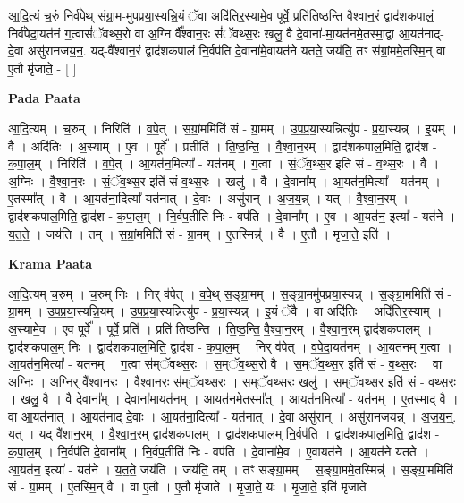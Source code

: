 \documentclass[17pt]{extarticle}
\begin{document}
आ॒दि॒त्यं च॒रुं निर्व॑पेथ् संग्रा॒म-मु॑पप्रया॒स्यन्नि॒यं ॅवा अदि॑तिर॒स्यामे॒व पूर्वे॒ प्रति॑तिष्ठन्ति वैश्वान॒रं द्वाद॑शकपालं॒ निर्व॑पेदा॒यत॑नं ग॒त्वासं॑ॅवथ्स॒रो वा अ॒ग्नि र्वै᳚श्वान॒रः सं॑ॅवथ्स॒रः खलु॒ वै दे॒वाना॑-मा॒यत॑नमे॒तस्मा॒द्वा आ॒यत॑नाद्-दे॒वा असु॑रानजय॒न॒. यद्-वै᳚श्वान॒रं द्वाद॑शकपालं नि॒र्वप॑ति दे॒वाना॑मे॒वायत॑ने यतते॒ जय॑ति॒ तꣳ स॑ग्रां॒ममे॒तस्मि॒न् वा ए॒तौ मृ॑जाते॒ - [  ] \newline

\textbf{Pada Paata} \newline

आ॒दि॒त्यम् । च॒रुम् । निरिति॑ । व॒पे॒त् । स॒ग्रां॒ममिति॑ सं - ग्रा॒मम् । उ॒प॒प्र॒या॒स्यन्नित्यु॑प - प्र॒या॒स्यन्न् । इ॒यम् । वै । अदि॑तिः । अ॒स्याम् । ए॒व । पूर्वे᳚ । प्रतीति॑ । ति॒ष्ठ॒न्ति॒ । वै॒श्वा॒न॒रम् । द्वाद॑शकपाल॒मिति॒ द्वाद॑श - क॒पा॒ल॒म् । निरिति॑ । व॒पे॒त् । आ॒यत॑न॒मित्या᳚ - यत॑नम् । ग॒त्वा । सं॒ॅव॒थ्स॒र इति॑ सं - व॒थ्स॒रः । वै । अ॒ग्निः । वै॒श्वा॒न॒रः । सं॒ॅव॒थ्स॒र इति॑ सं-व॒थ्स॒रः । खलु॑ । वै । दे॒वाना᳚म् । आ॒यत॑न॒मित्या᳚ - यत॑नम् । ए॒तस्मा᳚त् । वै । आ॒यत॑ना॒दित्या᳚-यत॑नात् । दे॒वाः । असु॑रान् । अ॒ज॒य॒न्न् । यत् । वै॒श्वा॒न॒रम् । द्वाद॑शकपाल॒मिति॒ द्वाद॑श - क॒पा॒ल॒म् । नि॒र्वप॒तीति॑ निः - वप॑ति । दे॒वाना᳚म् । ए॒व । आ॒यत॑न॒ इत्या᳚ - यत॑ने । य॒त॒ते॒ । जय॑ति । तम् । स॒ग्रां॒ममिति॑ सं - ग्रा॒मम् । ए॒तस्मिन्न्॑ । वै । ए॒तौ । मृ॒जा॒ते॒ इति॑ ।  \newline


\textbf{Krama Paata} \newline

आ॒दि॒त्यम् च॒रुम् । च॒रुम् निः । निर् व॑पेत् । व॒पे॒थ् स॒ङ्ग्रा॒मम् । स॒ङ्ग्रा॒ममु॑पप्रया॒स्यन्न् । स॒ङ्ग्रा॒ममिति॑ सं - ग्रा॒मम् । उ॒प॒प्र॒या॒स्यन्नि॒यम् । उ॒प॒प्र॒या॒स्यन्नित्यु॑प - प्र॒या॒स्यन्न् । इ॒यं ॅवै । वा अदि॑तिः । अदि॑तिर॒स्याम् । अ॒स्यामे॒व । ए॒व पूर्वे᳚ । पूर्वे॒ प्रति॑ । प्रति॑ तिष्ठन्ति । ति॒ष्ठ॒न्ति॒ वै॒श्वा॒न॒रम् । वै॒श्वा॒न॒रम् द्वाद॑शकपालम् । द्वाद॑शकपाल॒म् निः । द्वाद॑शकपाल॒मिति॒ द्वाद॑श - क॒पा॒ल॒म् । निर् व॑पेत् । व॒पे॒दा॒यत॑नम् । आ॒यत॑नम् ग॒त्वा । आ॒यत॑न॒मित्या᳚ - यत॑नम् । ग॒त्वा स॑म्ॅवथ्स॒रः । स॒म्ॅव॒थ्स॒रो वै । स॒म्ॅव॒थ्स॒र इति॑ सं - व॒थ्स॒रः । वा अ॒ग्निः । अ॒ग्निर् वै᳚श्वान॒रः । वै॒श्वा॒न॒रः स॑म्ॅवथ्स॒रः । स॒म्ॅव॒थ्स॒रः खलु॑ । स॒म्ॅव॒थ्स॒र इति॑ सं - व॒थ्स॒रः । खलु॒ वै । वै दे॒वाना᳚म् । दे॒वाना॑मा॒यत॑नम् । आ॒यत॑नमे॒तस्मा᳚त् । आ॒यत॑न॒मित्या᳚ - यत॑नम् । ए॒तस्मा॒द् वै । वा आ॒यत॑नात् । आ॒यत॑नाद् दे॒वाः । आ॒यत॑ना॒दित्या᳚ - यत॑नात् । दे॒वा असु॑रान् । असु॑रानजयन्न् । अ॒ज॒य॒न्॒. यत् । यद् वै᳚शान॒रम् । वै॒श्वा॒न॒रम् द्वाद॑शकपालम् । द्वाद॑शकपालम् नि॒र्वप॑ति । द्वाद॑शकपाल॒मिति॒ द्वाद॑श - क॒पा॒ल॒म् । नि॒र्वप॑ति दे॒वाना᳚म् । नि॒र्वप॒तीति॑ निः - वप॑ति । दे॒वाना॑मे॒व । ए॒वायत॑ने । आ॒यत॑ने यतते । आ॒यत॑न॒ इत्या᳚ - यत॑ने । य॒त॒ते॒ जय॑ति । जय॑ति॒ तम् । तꣳ स॑ङ्ग्रा॒मम् । स॒ङ्ग्रा॒ममे॒तस्मिन्न्॑ । स॒ङ्ग्रा॒ममिति॑ सं - ग्रा॒मम् । ए॒तस्मि॒न् वै । वा ए॒तौ । ए॒तौ मृ॑जाते । मृ॒जा॒ते॒ यः । मृ॒जा॒ते॒ इति॑ मृजाते \newline
\end{document}
